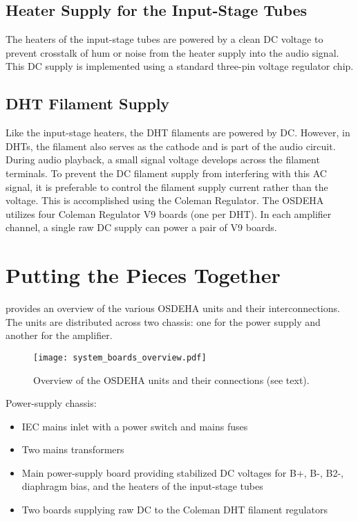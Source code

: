 \subsection{Heater Supply for the Input-Stage Tubes}
The heaters of the input-stage tubes are powered by a clean DC voltage to prevent crosstalk of hum or noise from the heater supply into the audio signal. This DC supply is implemented using a standard three-pin voltage regulator chip.

\subsection{DHT Filament Supply}
Like the input-stage heaters, the DHT filaments are powered by DC. However, in DHTs, the filament also serves as the cathode and is part of the audio circuit. During audio playback, a small signal voltage develops across the filament terminals. To prevent the DC filament supply from interfering with this AC signal, it is preferable to control the filament supply current rather than the voltage. This is accomplished using the Coleman Regulator\cite{ColemanDTHFilReg}. The OSDEHA utilizes four Coleman Regulator V9 boards (one per DHT). In each amplifier channel, a single raw DC supply can power a pair of V9 boards.


\section{Putting the Pieces Together}

 provides an overview of the various OSDEHA units and their interconnections. The units are distributed across two chassis: one for the power supply and another for the amplifier.

\begin{figure}
\begin{center}
\texttt{[image: system\_boards\_overview.pdf]}
\caption{Overview of the OSDEHA units and their connections (see text).}
\end{center}
\end{figure}

Power-supply chassis:
\begin{itemize}
\item IEC mains inlet with a power switch and mains fuses
\item Two mains transformers
\item Main power-supply board providing stabilized DC voltages for B+, B-, B2-, diaphragm bias, and the heaters of the input-stage tubes
\item Two boards supplying raw DC to the Coleman DHT filament regulators
\end{itemize}

